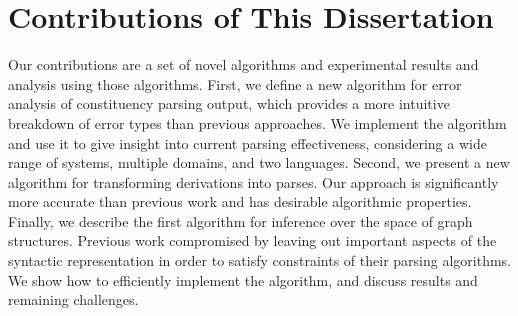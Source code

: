\section{Contributions of This Dissertation}

Our contributions are a set of novel algorithms and experimental results and analysis using those algorithms.
First, we define a new algorithm for error analysis of constituency parsing output, which provides a more intuitive breakdown of error types than previous approaches.
We implement the algorithm and use it to give insight into current parsing effectiveness, considering a wide range of systems, multiple domains, and two languages.
Second, we present a new algorithm for transforming \ccg derivations into \gb parses.
Our approach is significantly more accurate than previous work and has desirable algorithmic properties.
Finally, we describe the first algorithm for inference over the space of \gb graph structures.
Previous work compromised by leaving out important aspects of the syntactic representation in order to satisfy constraints of their parsing algorithms.
We show how to efficiently implement the algorithm, and discuss results and remaining challenges.

